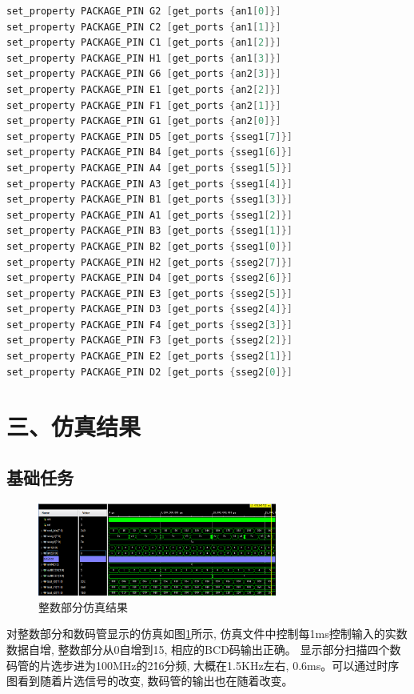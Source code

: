 \documentclass{article}
\newcommand{\fourhao}{\fontsize{14pt}{\baselineskip}\selectfont} %
\newcommand{\xiaosihao}{\fontsize{12pt}{\baselineskip}\selectfont} %
\begin{document}
\begin{lstlisting}[language=Verilog, caption={系统约束文件}]
set_property PACKAGE_PIN G2 [get_ports {an1[0]}]
set_property PACKAGE_PIN C2 [get_ports {an1[1]}]
set_property PACKAGE_PIN C1 [get_ports {an1[2]}]
set_property PACKAGE_PIN H1 [get_ports {an1[3]}]
set_property PACKAGE_PIN G6 [get_ports {an2[3]}]
set_property PACKAGE_PIN E1 [get_ports {an2[2]}]
set_property PACKAGE_PIN F1 [get_ports {an2[1]}]
set_property PACKAGE_PIN G1 [get_ports {an2[0]}]
set_property PACKAGE_PIN D5 [get_ports {sseg1[7]}]
set_property PACKAGE_PIN B4 [get_ports {sseg1[6]}]
set_property PACKAGE_PIN A4 [get_ports {sseg1[5]}]
set_property PACKAGE_PIN A3 [get_ports {sseg1[4]}]
set_property PACKAGE_PIN B1 [get_ports {sseg1[3]}]
set_property PACKAGE_PIN A1 [get_ports {sseg1[2]}]
set_property PACKAGE_PIN B3 [get_ports {sseg1[1]}]
set_property PACKAGE_PIN B2 [get_ports {sseg1[0]}]
set_property PACKAGE_PIN H2 [get_ports {sseg2[7]}]
set_property PACKAGE_PIN D4 [get_ports {sseg2[6]}]
set_property PACKAGE_PIN E3 [get_ports {sseg2[5]}]
set_property PACKAGE_PIN D3 [get_ports {sseg2[4]}]
set_property PACKAGE_PIN F4 [get_ports {sseg2[3]}]
set_property PACKAGE_PIN F3 [get_ports {sseg2[2]}]
set_property PACKAGE_PIN E2 [get_ports {sseg2[1]}]
set_property PACKAGE_PIN D2 [get_ports {sseg2[0]}]
\end{lstlisting}
\section*{\fourhao 三、仿真结果}
\xiaosihao
{}
\subsection*{基础任务}
\begin{figure}[H]
    \centering
    \includegraphics[width=0.7\textwidth]{image/2024-06-16-19-26-59.png}
    \caption{整数部分仿真结果}
    \label{image_int_sim}
\end{figure}
对整数部分和数码管显示的仿真如图\ref{image_int_sim}所示, 仿真文件中控制每1ms控制输入的实数数据自增, 整数部分从0自增到15, 相应的BCD码输出正确。
显示部分扫描四个数码管的片选步进为100MHz的2\^16分频, 大概在1.5KHz左右, 0.6ms。可以通过时序图看到随着片选信号的改变, 数码管的输出也在随着改变。
\end{document}
